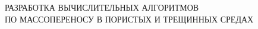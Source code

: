  \begin{center}
 {\large

 РАЗРАБОТКА ВЫЧИСЛИТЕЛЬНЫХ АЛГОРИТМОВ\\[4pt]
 ПО МАССОПЕРЕНОСУ В ПОРИСТЫХ И ТРЕЩИННЫХ СРЕДАХ}
 \\[12pt]
\end{center}

